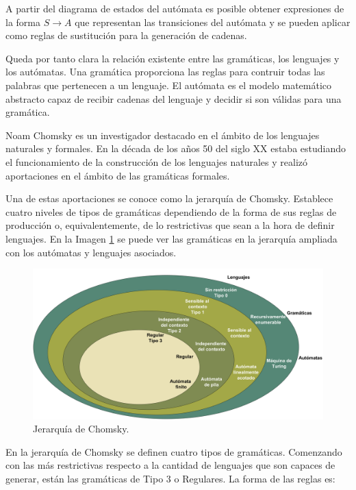 A partir del diagrama de estados del autómata es posible obtener expresiones de la forma $S\rightarrow A$ que representan las  transiciones del autómata y se pueden aplicar como reglas de sustitución para la generación de cadenas.


Queda por tanto clara la relación existente entre las gramáticas, los lenguajes y los autómatas. Una gramática proporciona las reglas para contruir todas las palabras que pertenecen a un lenguaje. El autómata es el modelo matemático abstracto capaz de recibir cadenas del lenguaje y decidir si son válidas para una gramática.


Noam Chomsky es un investigador destacado en el ámbito de los lenguajes naturales y formales. En la década de los años 50 del siglo XX estaba estudiando el funcionamiento de la construcción de los lenguajes naturales y realizó aportaciones en el ámbito de las gramáticas formales.

Una de estas aportaciones se conoce como la jerarquía de Chomsky. Establece cuatro niveles de tipos de gramáticas dependiendo de la forma de sus reglas de producción o, equivalentemente, de lo restrictivas que sean a la hora de definir lenguajes. En la Imagen \ref{fig:niveles-chomsky} se puede ver las gramáticas en la jerarquía ampliada con los autómatas y lenguajes asociados.

\begin{figure}[hp!]
    \centering
    \includegraphics[width=1.0\textwidth]{imaxes/c-bases-teoricas/niveles-chomsky.png}
    \caption{Jerarquía de Chomsky.}
    \label{fig:niveles-chomsky}
\end{figure}


En la jerarquía de Chomsky se definen cuatro tipos de gramáticas. Comenzando con las más restrictivas respecto a la cantidad de lenguajes que son capaces de generar, están las gramáticas de Tipo 3 o Regulares. La forma de las reglas es:

